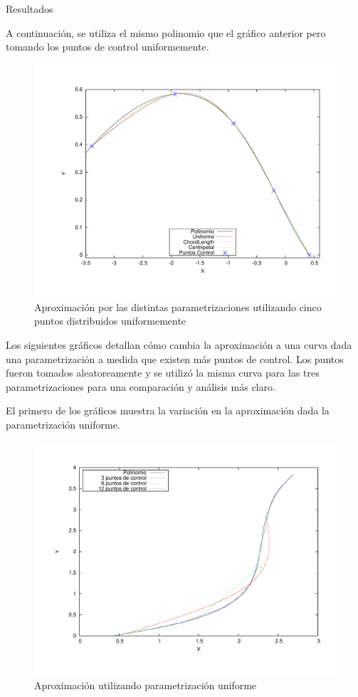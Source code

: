 \begin{section}{Resultados}
	\VSP
	
	A continuación, se utiliza el mismo polinomio que el gráfico anterior pero tomando los puntos de control uniformemente.
	
	\begin{figure}[H]
	  \centering
		\includegraphics[width=14cm]{graficos/5p_u.pdf}
	  \caption{Aproximación por las distintas parametrizaciones utilizando cinco puntos distribuidos uniformemente}
	  \label{fig:5p_u}
	\end{figure}
	
	\VSP

	Los siguientes gráficos detallan cómo cambia la aproximación a una curva dada una parametrización a medida que existen más puntos de control. Los puntos fueron tomados aleatoreamente y se utilizó la misma curva para las tres parametrizaciones para una comparación y análisis más claro.
		
	El primero de los gráficos muestra la variación en la aproximación dada la parametrización uniforme.
		
	\begin{figure}[H]
	  \centering
		\includegraphics[width=14cm]{graficos/uniform_grafiquinSame.pdf}
	  \caption{Aproximación utilizando parametrización uniforme}
	  \label{fig:uniform}
	\end{figure}
	

\end{section}
